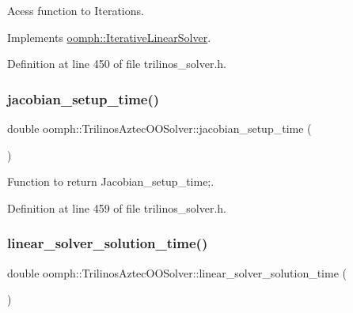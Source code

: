 Acess function to Iterations. 



Implements \hyperlink{classoomph_1_1IterativeLinearSolver_a5fe7f7b5e4847fdbd4f95d3875ec7a46}{oomph\+::\+Iterative\+Linear\+Solver}.



Definition at line 450 of file trilinos\+\_\+solver.\+h.

\mbox{\label{classoomph_1_1TrilinosAztecOOSolver_a3b7cf9349909686e3638aced9b29303f}} 
\subsubsection{\texorpdfstring{jacobian\+\_\+setup\+\_\+time()}{jacobian\_setup\_time()}}
{\footnotesize\ttfamily double oomph\+::\+Trilinos\+Aztec\+O\+O\+Solver\+::jacobian\+\_\+setup\+\_\+time (\begin{DoxyParamCaption}{ }\end{DoxyParamCaption})\hspace{0.3cm}{\ttfamily [inline]}}



Function to return Jacobian\+\_\+setup\+\_\+time;. 



Definition at line 459 of file trilinos\+\_\+solver.\+h.

\mbox{\label{classoomph_1_1TrilinosAztecOOSolver_a88cf6614457b404e38c6aed2e5d41257}} 
\subsubsection{\texorpdfstring{linear\+\_\+solver\+\_\+solution\+\_\+time()}{linear\_solver\_solution\_time()}}
{\footnotesize\ttfamily double oomph\+::\+Trilinos\+Aztec\+O\+O\+Solver\+::linear\+\_\+solver\+\_\+solution\+\_\+time (\begin{DoxyParamCaption}{ }\end{DoxyParamCaption})\hspace{0.3cm}{\ttfamily [inline]}}



